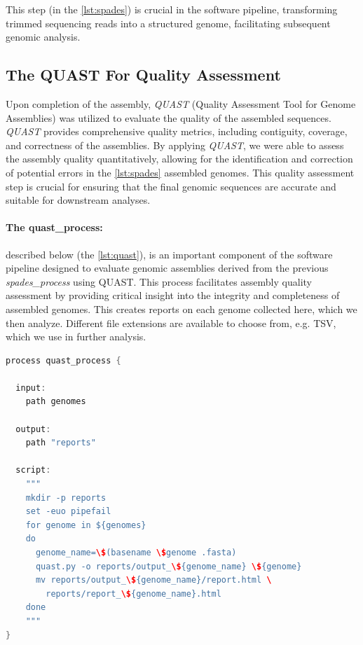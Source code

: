 This step (in the \autoref{lst:spades}) is crucial in the software pipeline, transforming trimmed sequencing reads into a structured genome, facilitating subsequent genomic analysis.

\subsection{The QUAST For Quality Assessment}
Upon completion of the \gls{assembly}, \textit{QUAST} (Quality Assessment Tool for Genome Assemblies) was utilized to evaluate the quality of the assembled sequences. \textit{QUAST} provides comprehensive quality \gls{metrics}, including contiguity, coverage, and correctness of the assemblies. By applying \textit{QUAST}, we were able to assess the assembly quality quantitatively, allowing for the identification and correction of potential errors in the \autoref{lst:spades} assembled \gls{genome}s. This quality assessment step is crucial for ensuring that the final genomic sequences are accurate and suitable for downstream analyses.

\paragraph{The quast\_process:}

described below (the \autoref{lst:quast}), is an important component of the software pipeline designed to evaluate genomic assemblies derived from the previous \textit{spades\_process} using QUAST. This process facilitates \gls{assembly} quality assessment by providing critical insight into the integrity and completeness of assembled \gls{genome}s. This creates reports on each \gls{genome} collected here, which we then analyze. Different file extensions are available to choose from, e.g. TSV, which we use in further analysis.

\begin{lstlisting}[language=Java, label={lst:quast}, caption={QUAST Quality Assessment Process in Nextflow}]
process quast_process {

  input:
    path genomes

  output:
    path "reports"

  script:
    """
    mkdir -p reports
    set -euo pipefail
    for genome in ${genomes}
    do
      genome_name=\$(basename \$genome .fasta)
      quast.py -o reports/output_\${genome_name} \${genome}
      mv reports/output_\${genome_name}/report.html \
        reports/report_\${genome_name}.html
    done
    """
}
\end{lstlisting}

